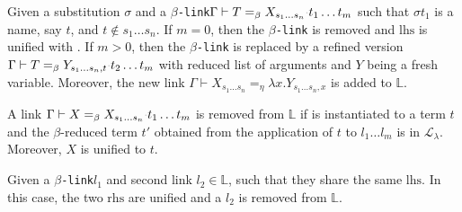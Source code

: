 \documentclass[sigconf,natbib=false,review]{acmart}
\newcommand{\appsep}{\ensuremath{\textcolor{lightgray}{\cdot}}}
\newcommand{\llambda}{\ensuremath{\mathcal{L}_\lambda}\xspace}
\newcommand{\linkMacro}[1]{\ensuremath{#1}\texttt{-link}\xspace}
\newcommand{\linkbeta}{\linkMacro{\beta}}
\newcommand{\linketaM}[3]{\ensuremath{#1 \vdash #2 =_\eta #3}}
\newcommand{\linkbetaM}[3]{\ensuremath{#1 \vdash #2 =_\beta #3}}
\newcommand{\lhs}{\ensuremath{\mathrm{lhs}}\xspace}
\newcommand{\rhs}{\ensuremath{\mathrm{rhs}}\xspace}
\newcommand{\linkStore}{\ensuremath{\mathbb{L}}\xspace}
\begin{document}
\begin{definition}[\progBetaLL]
  Given a substitution $\sigma$ and a \linkbeta \linkbetaM{\Gamma}{T}{\rhsBeta}
  such that $\sigma t_1$ is a name, say $t$, and $t\notin s_1\dots s_n$. If $m =
  0$, then the \linkbeta is removed and \lhs is unified with \rhsBetaHead.
  If $m > 0$, then the \linkbeta is replaced by a refined version
  $\linkbetaM{\Gamma}{T}{Y_{s_1\dots s_n,t}\appsep t_2\dots t_m}$ with reduced
  list of arguments and $Y$ being a fresh variable. Moreover, the new link
  \linketaM{\Gamma}{X_{s_1\dots s_n}}{\lambda x.Y_{s_1\dots s_n,x}} is added to 
  \linkStore.

  \label{def:progBetaLL}
\end{definition}

\begin{definition}[\progBetaRH]
  A link \linkbetaM{\Gamma}{X}{\rhsBeta} is removed from
  \linkStore if \rhsBetaHead is instantiated to a term $t$ and the
  $\beta$-reduced term $t'$ obtained from the application of $t$ to
  $l_1\dots l_m$ is in \llambda. Moreover, $X$ is unified to $t$.
  \label{def:progBetaRH}
\end{definition}

\begin{definition}[\progBetaDedup]
  Given a \linkbeta $l_1$ and second link $l_2 \in\linkStore$, such that they
  share the same \lhs. In this case, the two \rhs are unified and a $l_2$ is
  removed from \linkStore.
  \label{def:progBetaDedup}
\end{definition}
\end{document}
